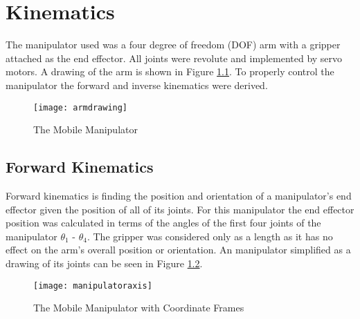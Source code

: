 \chapter{Kinematics}
The manipulator used was a four degree of freedom (DOF) arm with a gripper attached as the end effector. All joints were revolute and implemented by servo motors. A drawing of the arm is shown in Figure \ref{fig:ARM}. To properly control the manipulator the forward and inverse kinematics were derived.

\begin{figure} [h]
\centering
\texttt{[image: armdrawing]}
\caption{The Mobile Manipulator}
\label{fig:ARM}
\end{figure}

\section{Forward Kinematics}
Forward kinematics is finding the position and orientation of a manipulator's end effector given the position of all of its joints. For this manipulator the end effector position was calculated in terms of the angles of the first four joints of the manipulator $\theta_1$ - $\theta_4$. The gripper was considered only as a length as it has no effect on the arm's overall position or orientation. An manipulator simplified as a drawing of its joints can be seen in Figure \ref{fig:ARMCoord}.

\begin{figure}
\centering
\texttt{[image: manipulatoraxis]}
\caption{The Mobile Manipulator with Coordinate Frames}
\label{fig:ARMCoord}
\end{figure}

